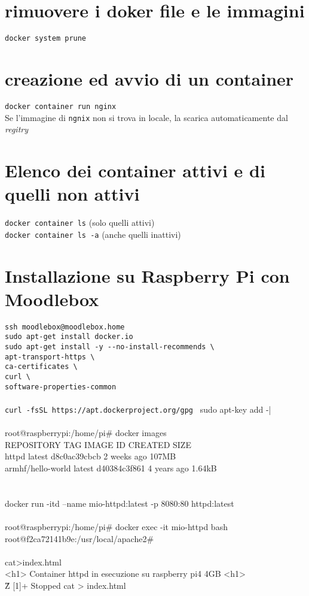 \documentclass[10pt,a4paper]{report}
\newcommand{\nota}[2]{%
	\marginpar[{\raggedleft\tiny\sffamily #1\\}]{%
		{\raggedright\tiny\sffamily #1\\}}}
\begin{document}
	\section{rimuovere i doker file e le immagini}
	\verb|docker system prune|
	\section{creazione ed avvio di un container}
	\verb|docker container run nginx|\\
	Se l'immagine di \verb|ngnix| non si trova in locale, la scarica automaticamente dal \textit{regitry}  
	\section{Elenco dei container attivi e di quelli non attivi}
	\verb|docker container ls| (solo quelli attivi)\\
	\verb|docker container ls -a| (anche quelli inattivi)
	
\section{Installazione su Raspberry Pi con Moodlebox}
\verb|ssh moodlebox@moodlebox.home|	\\
\verb|sudo apt-get install docker.io|\\
\verb|sudo apt-get install -y --no-install-recommends \|\\
\verb|apt-transport-https \|\\
\verb|ca-certificates \|\\
\verb|curl \|\\
\verb|software-properties-common|\\\\
\verb|curl -fsSL https://apt.dockerproject.org/gpg | sudo apt-key add -|
\\\\
root@raspberrypi:/home/pi\# docker images\\
	REPOSITORY          TAG       IMAGE ID       CREATED       SIZE\\
	httpd               latest    d8c0ac39cbcb   2 weeks ago   107MB\\
	armhf/hello-world   latest    d40384c3f861   4 years ago   1.64kB\\
	\\\\
	 docker run -itd --name mio-httpd:latest -p 8080:80 httpd:latest
	\\\\
	root@raspberrypi:/home/pi\# docker exec -it mio-httpd  bash\\
	root@f2ca72141b9e:/usr/local/apache2\#
	\\
	\\
	cat>index.html\\
	<h1> Container httpd in esecuzione su raspberry pi4 4GB <\/h1>\\
	\^Z
	[1]+  Stopped                 cat > index.html\\
	 
	
\end{document}
